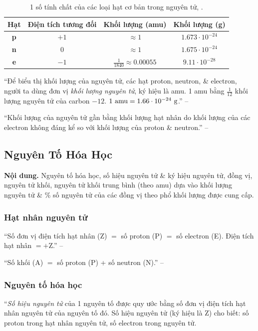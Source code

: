 \documentclass{article}
\numberwithin{equation}{section}
\begin{document}
\begin{table}[h]
	\centering
	\begin{tabular}{|c|c|c|c|}
		\hline
		\textbf{Hạt} & \textbf{Điện tích tương đối} & \textbf{Khối lượng (amu)} & \textbf{Khối lượng (g)} \\
		\hline
		\textbf{p} & $+1$ & $\approx 1$ & $1.673\cdot 10^{-24}$ \\
		\hline
		\textbf{n} & $0$ & $\approx 1$ & $1.675\cdot 10^{-24}$ \\
		\hline 
		\textbf{e} & $-1$ & $\frac{1}{1840}\approx 0.00055$ & $9.11\cdot 10^{-28}$ \\
		\hline
	\end{tabular}
	\caption{1 số tính chất của các loại hạt cơ bản trong nguyên tử, \cite[Bảng 2.1, p. 18]{SGK_Hoa_Hoc_10_Chan_Troi_Sang_Tao}.}
\end{table}
``Để biểu thị khối lượng của nguyên tử, các hạt proton, neutron, \& electron, người ta dùng đơn vị \textit{khối lượng nguyên tử}, ký hiệu là amu. 1 amu bằng $\frac{1}{12}$ khối lượng nguyên tử của carbon $-12$. $\rm 1\ amu = 1.66\cdot 10^{-24}\ g$.'' -- \cite[p. 18]{SGK_Hoa_Hoc_10_Chan_Troi_Sang_Tao}

``Khối lượng của nguyên tử gần bằng khối lượng hạt nhân do khối lượng của các electron không đáng kể so với khối lượng của proton \& neutron.'' -- \cite[p. 19]{SGK_Hoa_Hoc_10_Chan_Troi_Sang_Tao}


\subsection{Nguyên Tố Hóa Học}
\textsf{\textbf{Nội dung.} Nguyên tố hóa học, số hiệu nguyên tử \& ký hiệu nguyên tử, đồng vị, nguyên tử khối, nguyên tử khối trung bình (theo amu) dựa vào khối lượng nguyên tử \& \% số nguyên tử của các đồng vị theo phổ khối lượng được cung cấp.}

\subsubsection{Hạt nhân nguyên tử}
``Số đơn vị điện tích hạt nhân (Z) $=$ số proton (P) $=$ số electron (E). Điện tích hạt nhân $= +$Z.'' -- \cite[p. 20]{SGK_Hoa_Hoc_10_Chan_Troi_Sang_Tao}

``Số khối (A) $=$ số proton (P) + số neutron (N).'' -- \cite[p. 21]{SGK_Hoa_Hoc_10_Chan_Troi_Sang_Tao}

\subsubsection{Nguyên tố hóa học}
``\textit{Số hiệu nguyên tử} của 1 nguyên tố được quy ước bằng số đơn vị điện tích hạt nhân nguyên tử của nguyên tố đó. Số hiệu nguyên tử (ký hiệu là Z) cho biết: số proton trong hạt nhân nguyên tử, số electron trong nguyên tử.  
\end{document}
